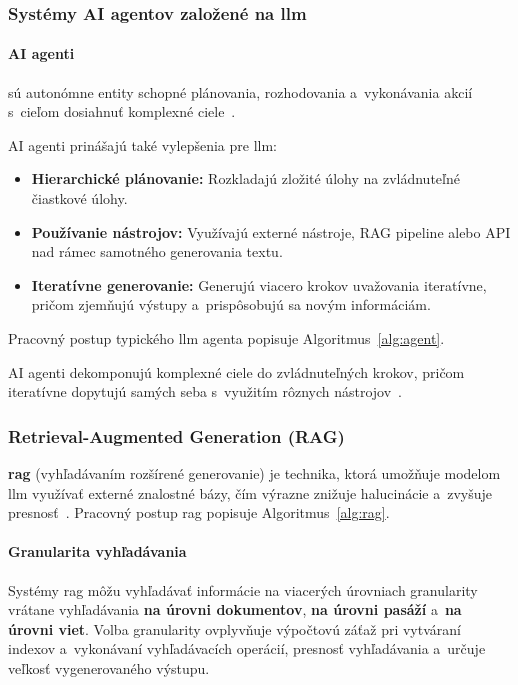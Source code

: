 \subsubsection*{Systémy AI agentov založené na \gls{llm}}

\paragraph{AI agenti} sú autonómne entity schopné plánovania, rozhodovania a~vykonávania akcií s~cieľom dosiahnuť komplexné ciele~\cite{naveed2023,zhao2023}.

AI agenti prinášajú také vylepšenia pre \gls{llm}:
\begin{itemize}
  \item \textbf{Hierarchické plánovanie:} Rozkladajú zložité úlohy na zvládnuteľné čiastkové úlohy.
  \item \textbf{Používanie nástrojov:} Využívajú externé nástroje, RAG pipeline alebo API nad rámec samotného generovania textu.
  \item \textbf{Iteratívne generovanie:} Generujú viacero krokov uvažovania iteratívne, pričom zjemňujú výstupy a~prispôsobujú sa novým informáciám.
\end{itemize}
Pracovný postup typického \gls{llm} agenta popisuje Algoritmus~\ref{alg:agent}.

AI agenti dekomponujú komplexné ciele do zvládnuteľných krokov, pričom iteratívne dopytujú samých seba s~využitím rôznych nástrojov~\cite{nvidia-llm-agent}.

\subsubsection*{Retrieval-Augmented Generation (RAG)}

\textbf{\gls{rag}} (vyhľadávaním rozšírené generovanie) je technika, ktorá umožňuje modelom \gls{llm} využívať externé znalostné bázy, čím výrazne znižuje halucinácie a~zvyšuje presnosť~\cite{zhao2023}. Pracovný postup \gls{rag} popisuje Algoritmus~\ref{alg:rag}.

\paragraph{Granularita vyhľadávania}
Systémy \gls{rag} môžu vyhľadávať informácie na viacerých úrovniach granularity vrátane vyhľadávania \textbf{na úrovni dokumentov}, \textbf{na úrovni pasáží} a~\textbf{na úrovni viet}. Volba granularity ovplyvňuje výpočtovú záťaž pri vytváraní indexov a~vykonávaní vyhľadávacích operácií, presnosť vyhľadávania a~určuje veľkosť vygenerovaného výstupu.


